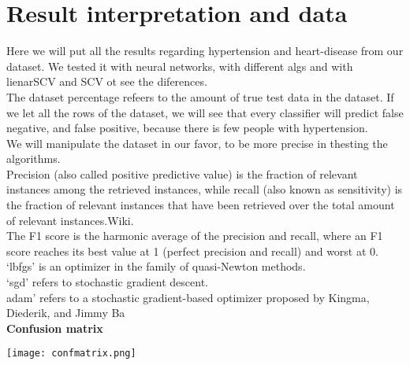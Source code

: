 \section{Result interpretation and data}

\tab Here we will put all the results regarding hypertension and heart-disease from our dataset. We tested it with neural networks, with different algs and with lienarSCV and SCV ot see the diferences. \\
\tab The dataset percentage refeers to the amount of true test data in the dataset. If we let all the rows of the dataset, we will see that every classifier will predict false negative, and false positive, because there is few people with hypertension.\\
\tab We will manipulate the dataset in our favor, to be more precise in thesting the algorithms.\\


\tab Precision (also called positive predictive value) is the fraction of relevant instances among the retrieved instances, while recall (also known as sensitivity) is the fraction of relevant instances that have been retrieved over the total amount of relevant instances.Wiki.\\

\tab The F1 score is the harmonic average of the precision and recall, where an F1 score reaches its best value at 1 (perfect precision and recall) and worst at 0.\\

\tab ‘lbfgs’ is an optimizer in the family of quasi-Newton methods.\\
\tab ‘sgd’ refers to stochastic gradient descent.\\
\tab adam’ refers to a stochastic gradient-based optimizer proposed by Kingma, Diederik, and Jimmy Ba\\


\tab \tab \textbf{Confusion matrix}
\begin{center}
\texttt{[image: confmatrix.png]}
\end{center}

